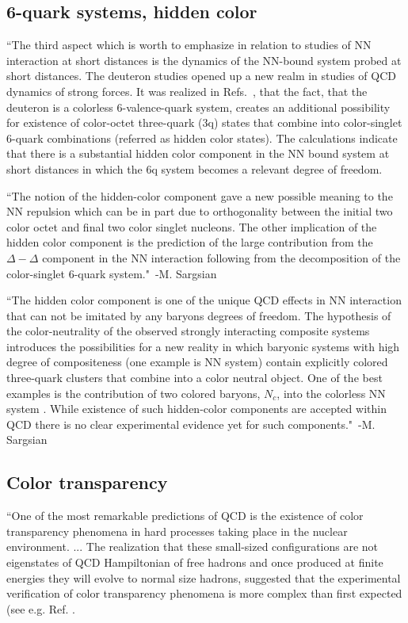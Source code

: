 \subsection{6-quark systems, hidden color}

``The third aspect which is worth to emphasize in relation to studies of NN interaction at short distances is the dynamics of the NN-bound system probed at short distances. The deuteron studies opened up a new realm in studies of QCD dynamics of strong forces. It was realized in Refs.~\cite{Harvey:1980rva, Obukhovsky:1982ci, Brodsky:1985gu, Ji:1985ky,Kusainov:1991vn}, that the fact, that the deuteron is a colorless 6-valence-quark system, creates an additional possibility for existence of color-octet three-quark (3q) states that combine into color-singlet 6-quark combinations (referred as hidden color states). The calculations indicate that there is a substantial hidden color component in the NN bound system at short distances in which the 6q system becomes a relevant degree of freedom.

``The notion of the hidden-color component gave a new possible meaning to the NN repulsion which can be in part due to orthogonality between the initial two color octet and final two color singlet nucleons. The other implication of the hidden color component is the prediction of the large contribution from the $\Delta-\Delta$ component in the NN interaction following from the decomposition of the color-singlet 6-quark system."~-M. Sargsian~\cite{Sargsian:2014bwa}

``The hidden color component is one of the unique QCD effects in NN interaction that can not be imitated by any baryons degrees of freedom. The hypothesis of the color-neutrality of the observed strongly interacting composite systems introduces the possibilities for a new reality in which baryonic systems with high degree of compositeness (one example is NN system) contain explicitly colored three-quark clusters that combine into a color neutral object. One of the best examples is the contribution of two colored baryons, $N_c$, into the colorless NN system \cite{Harvey:1980rva,Brodsky:1985gu,Ji:1985ky}. While existence of such hidden-color components are accepted within QCD there is no clear experimental evidence yet for such components."~-M. Sargsian~\cite{Sargsian:2014bwa}

\subsection{Color transparency}
``One of the most remarkable predictions of QCD is the existence of color transparency phenomena in hard processes taking place in the nuclear environment. ... The realization that these small-sized configurations are not eigenstates of QCD Hampiltonian of free hadrons and once produced at finite energies they will evolve to normal size hadrons, suggested that the experimental verification of color transparency phenomena is more complex than first expected (see e.g. Ref. \cite{Farrar:1988me,Kopeliovich:2007mm}.

